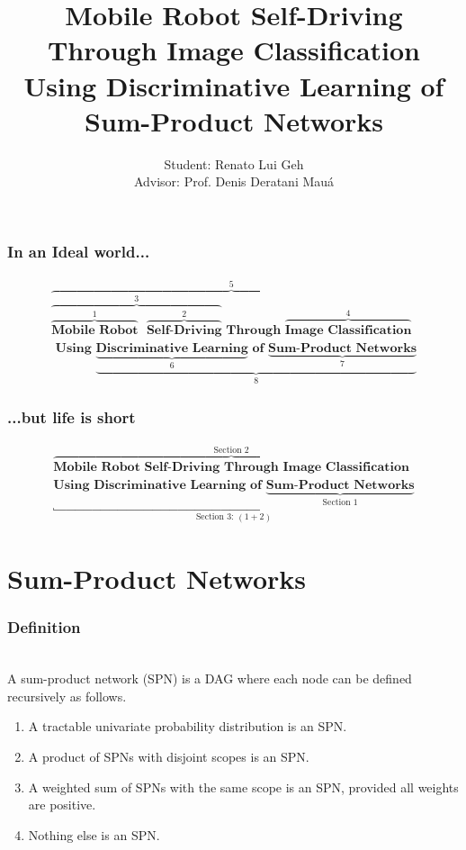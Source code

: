 \documentclass{beamer}
\title{Mobile Robot Self-Driving Through Image Classification Using Discriminative Learning of
Sum-Product Networks}
\date{}
\author{Student: Renato Lui Geh\\Advisor: Prof. Denis Deratani Mauá}
\institute{Institute of Mathematics and Statistics --- University of São Paulo}
\begin{document}
\maketitle

\begin{frame}
  \frametitle{In an Ideal world...}

  \begin{align*}
    \overbrace{\overbrace{\overbrace{\textbf{Mobile Robot}}^{1}\text{ }
    \overbrace{\textbf{Self-Driving}}^{2}}^{3}\textbf{ Through }
    \overbrace{\textbf{Image Classification}}^{4}}^{5}\\\textbf{ Using }
    \underbrace{\underbrace{\textbf{Discriminative Learning}}_{6}\textbf{ of }
    \underbrace{\textbf{Sum-Product Networks}}_{7}}_{8}
\end{align*}
\end{frame}

\begin{frame}
  \frametitle{...but life is short}

  \begin{align*}
    \overbrace{\textbf{Mobile Robot Self-Driving Through Image Classification}}^{\text{Section 2}}\\
    \underbracket{\textbf{Using Discriminative Learning of }\underbrace{\textbf{Sum-Product
    Networks}}_{\text{Section 1}}}_{\text{Section 3: }(1+2)}
  \end{align*}
\end{frame}

\section{Sum-Product Networks}

\begin{frame}
  \frametitle{Definition}
  \begin{definition}~\\
    A sum-product network (SPN) is a DAG where each node can be defined recursively as follows.
    \begin{enumerate}
      \item A tractable univariate probability distribution is an SPN\@.
      \item A product of SPNs with disjoint scopes is an SPN\@.
      \item A weighted sum of SPNs with the same scope is an SPN, provided all weights are positive.
      \item Nothing else is an SPN\@.
    \end{enumerate}
  \end{definition}
\end{frame}
\end{document}
